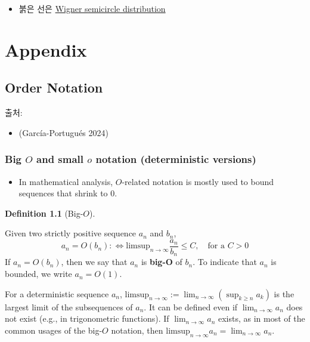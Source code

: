 \documentclass[
  13pt,
  letterpaper,
  DIV=11,
  numbers=noendperiod]{scrreprt}
\providecommand{\tightlist}{%
  \setlength{\itemsep}{0pt}\setlength{\parskip}{0pt}}\usepackage{longtable,booktabs,array}
\theoremstyle{definition}
\newtheorem{definition}{Definition}[chapter]
\theoremstyle{plain}
\theoremstyle{definition}
\theoremstyle{plain}
\theoremstyle{plain}
\theoremstyle{definition}
\theoremstyle{remark}
\begin{document}
\begin{itemize}
\tightlist
\item
  붉은 선은
  \href{https://en.wikipedia.org/wiki/Wigner_semicircle_distribution}{Wigner
  semicircle distribution}
\end{itemize}

\part{Appendix}

\chapter{Order Notation}\label{order-notation}

출처:

\begin{itemize}
\tightlist
\item
  (García-Portugués 2024)
\end{itemize}

\section{\texorpdfstring{Big \(O\) and small \(o\) notation
(deterministic
versions)}{Big O and small o notation (deterministic versions)}}\label{big-o-and-small-o-notation-deterministic-versions}

\begin{itemize}
\tightlist
\item
  In mathematical analysis, \(O\)-related notation is mostly used to
  bound sequences that shrink to \(0\).
\end{itemize}

\begin{definition}[Big-\(O\)]\protect\hypertarget{def-bigoh}{}\label{def-bigoh}

Given two strictly positive sequence \(a_n\) and \(b_n\), \[
a_n = O(b_n): \Longleftrightarrow \text{limsup}_{n\rightarrow \infty}\frac{a_n}{b_n} \leq C, \quad{} \text{for a } C>0
\] If \(a_n = O(b_n)\), then we say that \(a_n\) is \textbf{big-O} of
\(b_n\). To indicate that \(a_n\) is bounded, we write \(a_n = O(1)\).

\end{definition}

For a deterministic sequence \(a_n\),
\(\text{limsup}_{n\rightarrow \infty}:=\lim_{n\rightarrow \infty}(\sup_{k \geq n} a_k)\)
is the largest limit of the subsequences of \(a_n\). It can be defined
even if \(\lim_{n\rightarrow\infty}a_n\) does not exist (e.g., in
trigonometric functions). If \(\lim_{n\rightarrow\infty} a_n\) exists,
as in most of the common usages of the big-\(O\) notation, then
\(\text{limsup}_{n\rightarrow\infty}a_n = \lim_{n\rightarrow\infty}a_n\).
\end{document}
